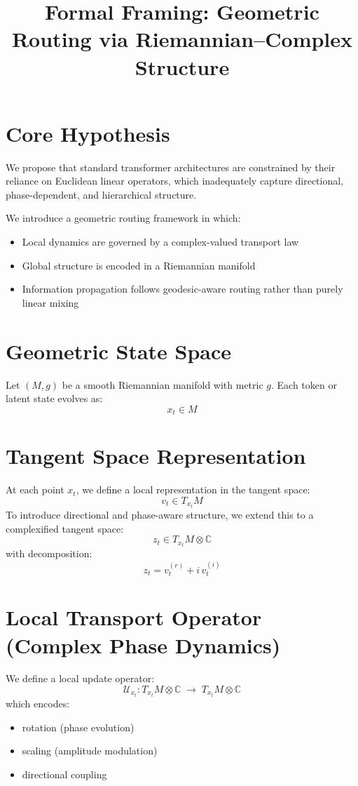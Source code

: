 \documentclass[11pt]{article}
\title{Formal Framing: Geometric Routing via Riemannian--Complex Structure}
\author{}
\date{}
\begin{document}
\maketitle

\section{Core Hypothesis}

We propose that standard transformer architectures are constrained by their reliance on
Euclidean linear operators, which inadequately capture directional, phase-dependent, and
hierarchical structure.

We introduce a geometric routing framework in which:
\begin{itemize}
    \item Local dynamics are governed by a complex-valued transport law
    \item Global structure is encoded in a Riemannian manifold
    \item Information propagation follows geodesic-aware routing rather than purely linear mixing
\end{itemize}

\section{Geometric State Space}

Let $(M, g)$ be a smooth Riemannian manifold with metric $g$.
Each token or latent state evolves as:
\[
    x_t \in M
\]

\section{Tangent Space Representation}

At each point $x_t$, we define a local representation in the tangent space:
\[
    v_t \in T_{x_t}M
\]
To introduce directional and phase-aware structure, we extend this to a complexified tangent
space:
\[
    z_t \in T_{x_t}M \otimes \mathbb{C}
\]
with decomposition:
\[
    z_t = v_t^{(r)} + i\,v_t^{(i)}
\]

\section{Local Transport Operator (Complex Phase Dynamics)}

We define a local update operator:
\[
    \mathcal{U}_{x_t} \colon T_{x_t}M \otimes \mathbb{C}
    \;\rightarrow\; T_{x_t}M \otimes \mathbb{C}
\]
which encodes:
\begin{itemize}
    \item rotation (phase evolution)
    \item scaling (amplitude modulation)
    \item directional coupling
\end{itemize}
\end{document}
